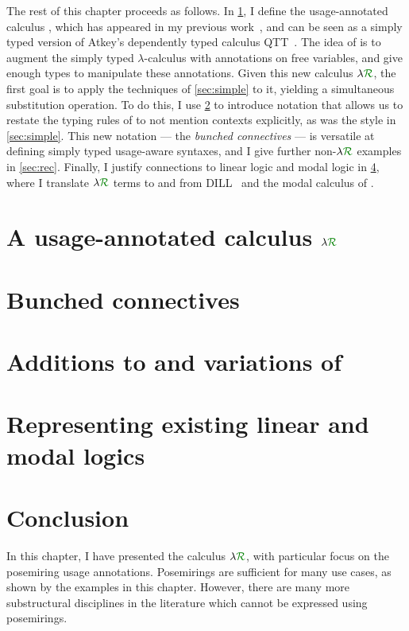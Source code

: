 The rest of this chapter proceeds as follows.
In \cref{sec:lr}, I define the usage-annotated calculus \name{}, which has
appeared in my previous work~\citep{WA21}, and can be seen as a
simply typed version of Atkey's dependently typed calculus QTT~\citep{Atkey18}.
The idea of \name{} is to augment the simply typed $\lambda$-calculus with
annotations on free variables, and give enough types to manipulate these
annotations.
Given this new calculus $\name$, the first goal is to apply the techniques of
\cref{sec:simple} to it, yielding a simultaneous substitution operation.
To do this, I use \cref{sec:lnd} to introduce notation that allows us to restate
the typing rules of \name{} to not mention contexts explicitly, as was the style
in \cref{sec:simple}.
This new notation --- the \emph{bunched connectives} --- is versatile at
defining simply typed usage-aware syntaxes, and I give further non-$\name$
examples in \cref{sec:rec}.
Finally, I justify connections to linear logic and modal logic in
\cref{sec:translation}, where I translate $\name$ terms to and from
DILL~\citep{Barber1996} and the modal calculus of \citet{judgmental}.

\section{A usage-annotated calculus $\name$}\label{sec:lr}

\section{Bunched connectives}\label{sec:lnd}

\section{Additions to and variations of \name{}}\label{sec:variant}

\section{Representing existing linear and modal logics}\label{sec:translation}


\section{Conclusion}\label{sec:semirings-conc}

In this chapter, I have presented the calculus $\name$, with particular focus on
the posemiring usage annotations.
Posemirings are sufficient for many use cases, as shown by the examples in this
chapter.
However, there are many more substructural disciplines in the literature which
cannot be expressed using posemirings.

